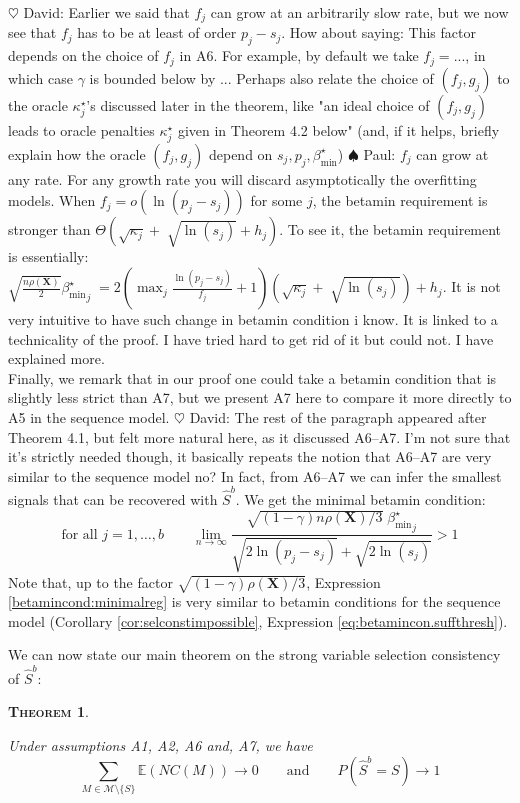 \documentclass[aos]{imsart}
\theoremstyle{plain}
\newtheorem{thm}{\textsc{Theorem}}[section]
\newcommand{\david}[1]{{\small{\color{blue} \sf $\heartsuit$ David: #1}}}
\newcommand{\paul}[1]{{\small{\color{green} \sf $\spadesuit$ Paul: #1}}}
\newcommand{\E}{\mathbb{E}}
\newcommand{\M}{\mathcal{M}}
\newcommand{\bs}{\boldsymbol}
\begin{document}
\david{Earlier we said that $f_j$ can grow at an arbitrarily slow rate, but we now see that $f_j$ has to be at least of order $p_j-s_j$. How about saying: This factor depends on the choice of $f_j$ in A6. For example, by default we take $f_j=...$, in which case $\gamma$ is bounded below by ... Perhaps also relate the choice of $(f_j,g_j)$ to the oracle $\kappa_j^\star$'s discussed later in the theorem, like "an ideal choice of $(f_j,g_j)$ leads to oracle penalties $\kappa_j^\star$ given in Theorem 4.2 below" (and, if it helps, briefly explain how the oracle $(f_j,g_j)$ depend on $s_j,p_j,\beta_{\min}^\star$)} \paul{$f_j$ can grow at any rate.  For any growth rate you will discard asymptotically the overfitting models. When $f_j= o(\ln(p_j-s_j))$ for some $j$, the betamin requirement is stronger than $\Theta(\sqrt{\kappa_j} +\; \sqrt{\ln(s_j)} + h_j)$. To see it, the betamin requirement is essentially: $\sqrt{\frac{ n\rho(\bs X)}{2}}{{\beta_{\min}^{\star}}_j}  \;=2(\max_j\frac{\ln(p_j-s_j)}{f_j}+1)(\sqrt{\kappa_j} +\; \sqrt{\ln(s_j)}) + h_j$. It is not very intuitive to have such change in betamin condition i know. It is linked to a technicality of the proof. I have tried hard to get rid of it but could not. I have explained more.\\}
Finally, we remark that in our proof one could take a betamin condition that is slightly less strict than A7, but we present A7 here to compare it more directly to A5 in the sequence model.  
\david{The rest of the paragraph appeared after Theorem 4.1, but felt more natural here, as it discussed A6--A7. I'm not sure that it's strictly needed though, it basically repeats the notion that A6--A7 are very similar to the sequence model no?} In fact, from A6--A7 we can infer the smallest signals that can be recovered with $\hat{S}^{b}$.
We get the minimal betamin condition:
\begin{equation}\label{betamincond:minimalreg} \mbox{for all }j=1,\ldots,b \qquad
    \lim_{n\to \infty}\frac{\sqrt{(1-\gamma) n\rho(\bs X)/3}\;{\beta_{\min}^{\star}}_j}{\sqrt{2\ln(p_j-s_j)} + \sqrt{2\ln(s_j)}} >1
\end{equation}
Note that, up to the factor $\sqrt{(1-\gamma)\rho(\bs X)/3}$, Expression \eqref{betamincond:minimalreg} is very similar to betamin conditions for the sequence model (Corollary \ref{cor:selconstimpossible}, Expression \eqref{eq:betamincon.suffthresh}).




We can now state our main theorem on the strong variable selection consistency of $\hat{S}^{b}$:
\begin{thm}\label{theo:suffcondlinearmodel}

Under assumptions A1, A2, A6 and, A7, we have
$$\sum_{M \in \M\setminus \{S\}}\E\left(NC(M)\right)\to 0 \qquad \mbox{and} \qquad P(\hat{S}^b = S) \to 1$$
\end{thm}
\end{document}
